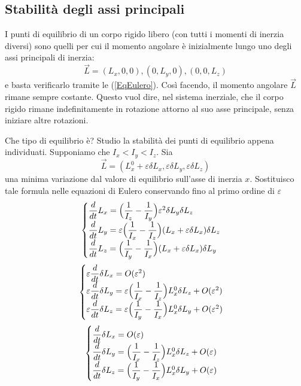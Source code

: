 \documentclass[a4paper,openany]{article}
\begin{document}
	\subsection{Stabilità degli assi principali}
	I punti di equilibrio di un corpo rigido libero (con tutti i momenti di inerzia diversi) sono quelli per cui il momento angolare è inizialmente lungo uno degli assi principali di inerzia:
	$$
	\vec{L} = (L_x,0,0), (0,L_y,0), (0,0,L_z)
	$$
	e basta verificarlo tramite le (\ref{EqEulero}). Così facendo, il momento angolare $\vec{L}$ rimane sempre costante. Questo vuol dire, nel sistema inerziale, che il corpo rigido rimane indefinitamente in rotazione attorno al suo asse principale, senza iniziare altre rotazioni.
	
	Che tipo di equilibrio è? Studio la stabilità dei punti di equilibrio appena individuati. Supponiamo che $I_x<I_y<I_z$.
	Sia 
	$$
	\vec{L} = (L_x^0 + \varepsilon\delta L_x, \varepsilon\delta L_y,\varepsilon\delta L_z)
	$$
	una minima variazione dal valore di equilibrio sull'asse di inerzia $x$. Sostituisco tale formula nelle equazioni di Eulero conservando fino al primo ordine di $\varepsilon$
	\begin{equation}\label{key}
		\begin{cases}
			\dfrac{d}{dt}L_x = \Bigl(\dfrac{1}{I_z}-\dfrac{1}{I_y}\Bigl) \varepsilon^{2}\delta L_y\delta L_z \\
			\dfrac{d}{dt}L_y =\varepsilon \Bigl(\dfrac{1}{I_x}-\dfrac{1}{I_z}\Bigl)(L_x+\varepsilon\delta L_x)\delta L_z \\
			\dfrac{d}{dt}L_z = \Bigl(\dfrac{1}{I_y}-\dfrac{1}{I_x}\Bigl)(L_x+\varepsilon\delta L_x)\delta L_y
		\end{cases}
	\end{equation}
	\begin{equation}\label{key}
		\begin{cases}
			\varepsilon\dfrac{d}{dt}\delta L_x =O(\varepsilon^2)\\
			\varepsilon\dfrac{d}{dt}\delta L_y =\varepsilon \Bigl(\dfrac{1}{I_x}-\dfrac{1}{I_z}\Bigl)L_x^{0}\delta L_z + O(\varepsilon^2) \\
			\varepsilon \dfrac{d}{dt}\delta L_z =\varepsilon \Bigl(\dfrac{1}{I_y}-\dfrac{1}{I_x}\Bigl)L_x^{0}\delta L_y + O(\varepsilon^2)
		\end{cases}
	\end{equation}	
	\begin{equation}\label{key}
		\begin{cases}
			\dfrac{d}{dt}\delta L_x =O(\varepsilon)\\
			\dfrac{d}{dt}\delta L_y = \Bigl(\dfrac{1}{I_x}-\dfrac{1}{I_z}\Bigl)L_x^{0}\delta L_z + O(\varepsilon) \\
			\dfrac{d}{dt}\delta L_z = \Bigl(\dfrac{1}{I_y}-\dfrac{1}{I_x}\Bigl)L_x^{0}\delta L_y + O(\varepsilon)
		\end{cases}
	\end{equation}	
\end{document}
